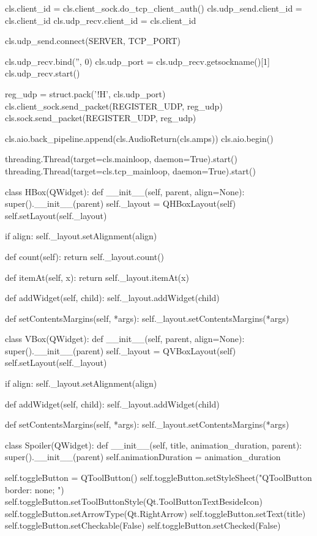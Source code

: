 \begin{pythoncode}
        cls.client_id = cls.client_sock.do_tcp_client_auth()
        cls.udp_send.client_id = cls.client_id
        cls.udp_recv.client_id = cls.client_id

        cls.udp_send.connect(SERVER, TCP_PORT)

        cls.udp_recv.bind('', 0)
        cls.udp_port = cls.udp_recv.getsockname()[1]
        cls.udp_recv.start()

        reg_udp = struct.pack('!H', cls.udp_port)
        cls.client_sock.send_packet(REGISTER_UDP, reg_udp)
        cls.sock.send_packet(REGISTER_UDP, reg_udp)

        cls.aio.back_pipeline.append(cls.AudioReturn(cls.amps))
        cls.aio.begin()

        threading.Thread(target=cls.mainloop, daemon=True).start()
        threading.Thread(target=cls.tcp_mainloop, daemon=True).start()


class HBox(QWidget):
    def __init__(self, parent, align=None):
        super().__init__(parent)
        self._layout = QHBoxLayout(self)
        self.setLayout(self._layout)

        if align:
            self._layout.setAlignment(align)

    def count(self):
        return self._layout.count()

    def itemAt(self, x):
        return self._layout.itemAt(x)

    def addWidget(self, child):
        self._layout.addWidget(child)

    def setContentsMargins(self, *args):
        self._layout.setContentsMargins(*args)


class VBox(QWidget):
    def __init__(self, parent, align=None):
        super().__init__(parent)
        self._layout = QVBoxLayout(self)
        self.setLayout(self._layout)

        if align:
            self._layout.setAlignment(align)

    def addWidget(self, child):
        self._layout.addWidget(child)

    def setContentsMargins(self, *args):
        self._layout.setContentsMargins(*args)


class Spoiler(QWidget):
    def __init__(self, title, animation_duration, parent):
        super().__init__(parent)
        self.animationDuration = animation_duration

        self.toggleButton = QToolButton()
        self.toggleButton.setStyleSheet("QToolButton { border: none; }")
        self.toggleButton.setToolButtonStyle(Qt.ToolButtonTextBesideIcon)
        self.toggleButton.setArrowType(Qt.RightArrow)
        self.toggleButton.setText(title)
        self.toggleButton.setCheckable(False)
        self.toggleButton.setChecked(False)


\end{pythoncode}
